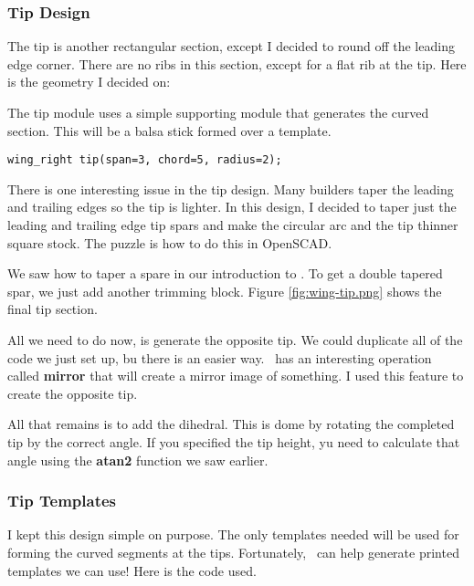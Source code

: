 
\subsubsection{Tip Design}

The tip is another rectangular section, except I decided to round off the
leading edge corner. There are no ribs in this section, except for a flat rib
at the tip. Here is the geometry I decided on:


The tip module uses a simple supporting module that generates the curved section.
This will be a balsa stick formed over a template.

\begin{lstlisting}
wing_right tip(span=3, chord=5, radius=2);
\end{lstlisting}

There is one interesting issue in the tip design. Many builders taper the
leading and trailing edges so the tip is lighter. In this design, I decided to
taper just the leading and trailing edge tip spars and make the circular arc
and the tip thinner square stock. The puzzle is how to do this in OpenSCAD.

We saw how to taper a spare in our introduction to \osc. To get a double
tapered spar, we just add another trimming block.  Figure
\ref{fig:wing-tip.png} shows the final tip section.


All we need to do now, is generate the opposite tip. We could duplicate all of
the code we just set up, bu there is an easier way. \osc\ has an interesting
operation called {\bf mirror} that will create a mirror image of something. I
used this feature to create the opposite tip.

All that remains is to add the dihedral. This is dome by rotating the completed
tip by the correct angle. If you specified the tip height, yu need to calculate
that angle using the {\bf atan2} function we saw earlier.


\subsubsection{Tip Templates}

I kept this design simple on purpose. The only templates needed will be used
for forming the curved segments at the tips. Fortunately, \osc\ can help
generate printed templates we can use! Here is the code used.

